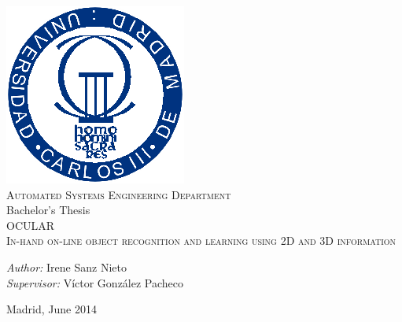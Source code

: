 \begin{titlepage}
\begin{center}

 \includegraphics[size=0.8]{img/uc3m.eps}  \\[0.5 cm]

\large \textsc{Automated Systems Engineering Department} \\ [1 cm]

\large Bachelor's Thesis\\[1 cm]
\Huge \textsc{OCULAR} \\[1 cm]
\huge \textsc{In-hand on-line object recognition and learning using 2D and 3D information}\\[9 cm]


\begin{flushleft} \Large
\emph{Author:} Irene Sanz Nieto\\[0.5 cm]
\emph{Supervisor:} Víctor González Pacheco \\

\end{flushleft}

\vfill

{\large Madrid, June 2014}

\end{center}
\end{titlepage}
